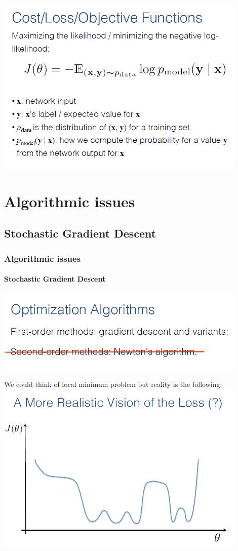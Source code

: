 \documentclass{beamer}
\begin{document}
\begin{frame}
\includegraphics[width=0.9\textwidth]{images/archi_4.PNG} 
\end{frame}

\section{Algorithmic issues}
\subsection{Stochastic Gradient Descent}
\begin{frame}
\frametitle{Algorithmic issues}
\framesubtitle{Stochastic Gradient Descent}
\includegraphics[width=0.9\textwidth]{images/optim_2.PNG} \\
\end{frame}
\begin{frame}
We could think of local minimum problem but reality is the following:
\includegraphics[width=0.9\textwidth]{images/optim_4.PNG} \\
\end{frame}
\end{document}
